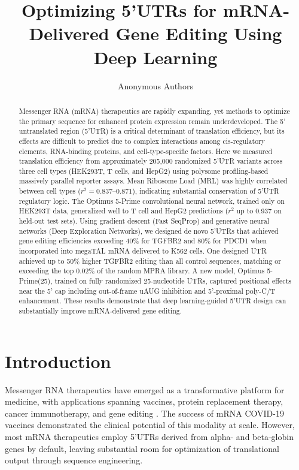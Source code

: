 \documentclass[12pt]{article}
\title{Optimizing 5'UTRs for mRNA-Delivered Gene Editing Using Deep Learning}
\author{Anonymous Authors}
\date{}
\begin{document}
\maketitle

\begin{abstract}
Messenger RNA (mRNA) therapeutics are rapidly expanding, yet methods to optimize the primary sequence for enhanced protein expression remain underdeveloped. The 5' untranslated region (5'UTR) is a critical determinant of translation efficiency, but its effects are difficult to predict due to complex interactions among cis-regulatory elements, RNA-binding proteins, and cell-type-specific factors. Here we measured translation efficiency from approximately 205,000 randomized 5'UTR variants across three cell types (HEK293T, T cells, and HepG2) using polysome profiling-based massively parallel reporter assays. Mean Ribosome Load (MRL) was highly correlated between cell types ($r^2 = 0.837$--$0.871$), indicating substantial conservation of 5'UTR regulatory logic. The Optimus 5-Prime convolutional neural network, trained only on HEK293T data, generalized well to T cell and HepG2 predictions ($r^2$ up to 0.937 on held-out test sets). Using gradient descent (Fast SeqProp) and generative neural networks (Deep Exploration Networks), we designed de novo 5'UTRs that achieved gene editing efficiencies exceeding 40\% for TGFBR2 and 80\% for PDCD1 when incorporated into megaTAL mRNA delivered to K562 cells. One designed UTR achieved up to 50\% higher TGFBR2 editing than all control sequences, matching or exceeding the top 0.02\% of the random MPRA library. A new model, Optimus 5-Prime(25), trained on fully randomized 25-nucleotide UTRs, captured positional effects near the 5' cap including out-of-frame uAUG inhibition and 5'-proximal poly-C/T enhancement. These results demonstrate that deep learning-guided 5'UTR design can substantially improve mRNA-delivered gene editing.
\end{abstract}

\section{Introduction}

Messenger RNA therapeutics have emerged as a transformative platform for medicine, with applications spanning vaccines, protein replacement therapy, cancer immunotherapy, and gene editing \citep{sahin2014mrna, polack2020safety}. The success of mRNA COVID-19 vaccines demonstrated the clinical potential of this modality at scale. However, most mRNA therapeutics employ 5'UTRs derived from alpha- and beta-globin genes by default, leaving substantial room for optimization of translational output through sequence engineering.
\end{document}

